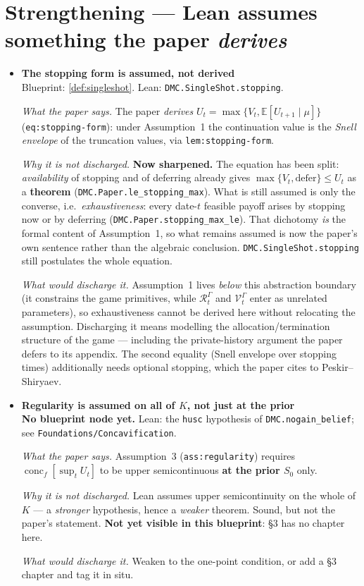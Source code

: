 \section*{Strengthening --- Lean assumes something the paper \emph{derives}}
\begin{itemize}
  \item[] \textbf{The stopping form is assumed, not derived}\\
  Blueprint: \ref{def:singleshot}. Lean: \texttt{DMC.SingleShot.stopping}.
  \par\smallskip\emph{What the paper says.} The paper \emph{derives} $U_t=\max\{V_t,\mathbb E[U_{t+1}\mid\mu]\}$ (\texttt{eq:stopping-form}): under Assumption~1 the continuation value is the \emph{Snell envelope} of the truncation values, via \texttt{lem:stopping-form}.
  \par\smallskip\emph{Why it is not discharged.} \textbf{Now sharpened.} The equation has been split: \emph{availability} of stopping and of deferring already gives $\max\{V_t,\text{defer}\}\le U_t$ as a \textbf{theorem} (\texttt{DMC.Paper.le\_stopping\_max}). What is still assumed is only the converse, i.e.\ \emph{exhaustiveness}: every date-$t$ feasible payoff arises by stopping now or by deferring (\texttt{DMC.Paper.stopping\_max\_le}). That dichotomy \emph{is} the formal content of Assumption~1, so what remains assumed is now the paper's own sentence rather than the algebraic conclusion. \texttt{DMC.SingleShot.stopping} still postulates the whole equation.
  \par\smallskip\emph{What would discharge it.} Assumption~1 lives \emph{below} this abstraction boundary (it constrains the game primitives, while $\mathcal R_t^{\Gamma}$ and $\mathcal V_t^{\Gamma}$ enter as unrelated parameters), so exhaustiveness cannot be derived here without relocating the assumption. Discharging it means modelling the allocation/termination structure of the game --- including the private-history argument the paper defers to its appendix. The second equality (Snell envelope over stopping times) additionally needs optional stopping, which the paper cites to Peskir--Shiryaev.
\end{itemize}
\begin{itemize}
  \item[] \textbf{Regularity is assumed on all of $K$, not just at the prior}\\
  \textbf{No blueprint node yet.} Lean: the \texttt{husc} hypothesis of \texttt{DMC.nogain\_belief}; see \texttt{Foundations/Concavification}.
  \par\smallskip\emph{What the paper says.} Assumption~3 (\texttt{ass:regularity}) requires $\operatorname{conc}_f[\sup_t U_t]$ to be upper semicontinuous \textbf{at the prior $S_0$} only.
  \par\smallskip\emph{Why it is not discharged.} Lean assumes upper semicontinuity on the whole of $K$ --- a \emph{stronger} hypothesis, hence a \emph{weaker} theorem. Sound, but not the paper's statement. \textbf{Not yet visible in this blueprint}: \S3 has no chapter here.
  \par\smallskip\emph{What would discharge it.} Weaken to the one-point condition, or add a \S3 chapter and tag it in situ.
\end{itemize}

